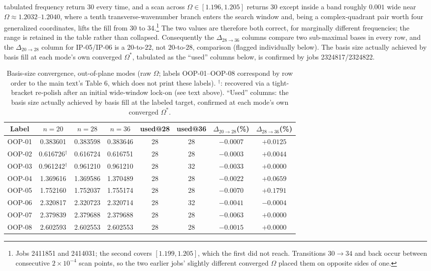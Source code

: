 \documentclass[11pt]{article}
\begin{document}
tabulated frequency return 30 every time, and a scan across
$\Omega\in[1.196,1.205]$ returns 30 except inside a band roughly
$0.001$ wide near $\Omega\approx1.2032$--$1.2040$, where a tenth
transverse-wavenumber branch enters the search window and, being a
complex-quadrant pair worth four generalized coordinates, lifts the fill
from 30 to 34.\footnote{Jobs 2411851 and 2414031; the second covers
$[1.199,1.205]$, which the first did not reach. Transitions
$30\!\to\!34$ and back occur between consecutive $2\times10^{-4}$ scan
points, so the two earlier jobs' slightly different converged $\Omega$
placed them on opposite sides of one.} The two values are therefore both
correct, for marginally different frequencies; the range is retained in
the table rather than collapsed. Consequently the $\Delta_{28\to36}$
columns compare two sub-maximal bases in every row, and the
$\Delta_{20\to28}$ column for IP-05/IP-06 is a $20$-to-$22$, not
$20$-to-$28$, comparison (flagged individually below). The basis size
actually achieved by basis fill at each mode's own converged
$\Omega^{*}$, tabulated as the ``used'' columns below, is confirmed by
jobs 2324817/2324822.

\begin{table}[!htbp]\centering\small
\caption{Basis-size convergence, out-of-plane modes (raw $\Omega$;
labels OOP-01--OOP-08 correspond by row order to the main text's
Table 6, which does not print these labels). $^\dagger$: recovered via a
tight-bracket re-polish after an initial wide-window lock-on (see text
above). ``Used'' columns: the basis size actually achieved by
basis fill at the labeled target, confirmed at each mode's own
converged $\Omega^{*}$.}
\label{tab:conv-oop}
\begin{tabular}{cccccccc}
\toprule Label & $n{=}20$ & $n{=}28$ & $n{=}36$ & used@28 & used@36 & $\Delta_{20\to28}$(\%) & $\Delta_{28\to36}$(\%)\\ \midrule
OOP-01 & 0.383601 & 0.383598 & 0.383646 & 28 & 28 & $-0.0007$ & $+0.0125$\\
OOP-02 & 0.616726$^\dagger$ & 0.616724 & 0.616751 & 28 & 28 & $-0.0003$ & $+0.0044$\\
OOP-03 & 0.961242$^\dagger$ & 0.961210 & 0.961210 & 28 & 32 & $-0.0033$ & $+0.0000$\\
OOP-04 & 1.369616 & 1.369586 & 1.370489 & 28 & 28 & $-0.0022$ & $+0.0659$\\
OOP-05 & 1.752160 & 1.752037 & 1.755174 & 28 & 28 & $-0.0070$ & $+0.1791$\\
OOP-06 & 2.320817 & 2.320723 & 2.320714 & 28 & 32 & $-0.0041$ & $-0.0004$\\
OOP-07 & 2.379839 & 2.379688 & 2.379688 & 28 & 28 & $-0.0063$ & $+0.0000$\\
OOP-08 & 2.602593 & 2.602553 & 2.602553 & 28 & 28 & $-0.0015$ & $+0.0000$\\ \bottomrule
\end{tabular}
\end{table}
\end{document}
